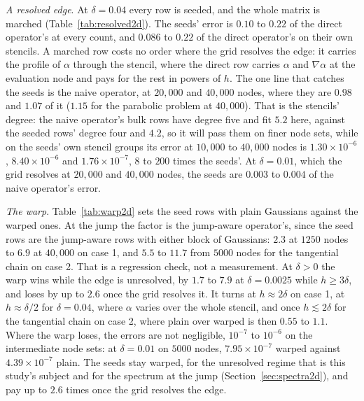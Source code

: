 \documentclass[11pt]{amsart}
\theoremstyle{definition}
\theoremstyle{remark}
\newcommand{\para}[1]{\par\smallskip\noindent\textit{#1}.\enspace}
\newcommand{\sci}[2]{#1 \times 10^{#2}}
\begin{document}
\para{A resolved edge}
At $\delta = 0.04$ every row is seeded, and the whole matrix is marched
(Table~\ref{tab:resolved2d}). The seeds' error is $0.10$ to $0.22$ of the
direct operator's at every count, and $0.086$ to $0.22$ of the direct
operator's on their own stencils. A marched row costs no order where the
grid resolves the edge: it carries the profile of $\alpha$ through
the stencil, where the direct row carries $\alpha$ and $\nabla \alpha$ at the
evaluation node and pays for the rest in powers of $h$. The one line that
catches the seeds is the naive operator, at $20{,}000$ and $40{,}000$ nodes,
where they are $0.98$ and $1.07$ of it ($1.15$ for the parabolic problem at
$40{,}000$). That is the stencils' degree: the naive operator's bulk rows
have degree five and fit $5.2$ here, against the seeded rows' degree four and
$4.2$, so it will pass them on finer node sets, while on the seeds' own
stencil groups its error at $10{,}000$ to $40{,}000$ nodes is
$\sci{1.30}{-6}$, $\sci{8.40}{-6}$ and $\sci{1.76}{-7}$, $8$ to $200$ times
the seeds'. At $\delta = 0.01$, which the grid resolves at $20{,}000$ and
$40{,}000$ nodes, the seeds are $0.003$ to $0.004$ of the naive operator's
error.

\begin{table}
  \centering
  \caption{The resolved edge, case 1 at $\delta = 0.04$, where every row is
  seeded: the seeds' RMS error at equilibrium, and its ratio to the direct
  operator's (on the degree-five stencils and on the seeds' own) and to the
  naive operator's, at equilibrium and for the parabolic problem. Fits over
  $1250$ to $40{,}000$ nodes.}
  \label{tab:resolved2d}
  \footnotesize
  
\end{table}

\para{The warp}
Table~\ref{tab:warp2d} sets the seed rows with plain Gaussians against the
warped ones. At the jump the factor is the jump-aware operator's, since the
seed rows are the jump-aware rows with either block of Gaussians: $2.3$ at
$1250$ nodes to $6.9$ at $40{,}000$ on case 1, and $5.5$ to $11.7$ from $5000$
nodes for the tangential chain on case 2. That is a regression check, not a
measurement. At $\delta > 0$ the warp wins while the edge is unresolved, by
$1.7$ to $7.9$ at $\delta = 0.0025$ while $h \ge 3\delta$, and loses by up to
$2.6$ once the grid resolves it. It turns at $h \approx 2\delta$ on case 1,
at $h \approx \delta/2$ for $\delta = 0.04$, where $\alpha$ varies over the
whole stencil, and once $h \lesssim 2\delta$ for the tangential chain on
case 2, where plain over warped is then $0.55$ to $1.1$. Where the warp
loses, the errors are not negligible, $10^{-7}$ to $10^{-6}$ on the
intermediate node sets: at $\delta = 0.01$ on $5000$ nodes, $\sci{7.95}{-7}$
warped against $\sci{4.39}{-7}$ plain. The seeds stay warped, for the
unresolved regime that is this study's subject and for the spectrum at the
jump (Section~\ref{sec:spectra2d}), and pay up to $2.6$ times once the grid
resolves the edge.
\end{document}
